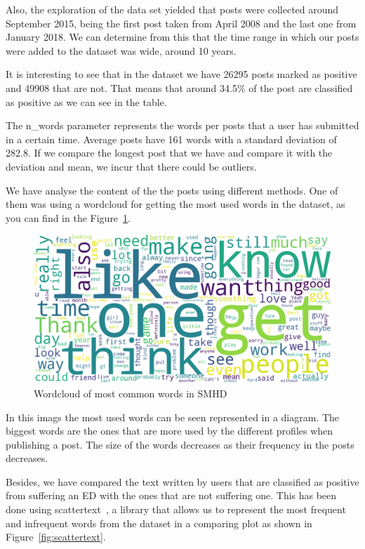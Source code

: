 Also, the exploration of the data set yielded that  posts were collected around September 2015, being the first post taken from April 2008 and the last one from January 2018. We can determine from this that the time range in which our posts were added to the dataset was wide, around 10 years.

It is interesting to see that in the dataset we have 26295 posts marked as positive and 49908 that are not. That means that around 34.5\% of the post are classified as positive as we can see in the table.

The n\_words parameter represents the words per posts that a user has submitted in a certain time. Average posts have 161 words with a standard deviation of 282.8. If we compare the longest post that we have and compare it with the deviation and mean, we incur that there could be outliers.

 We have analyse the content of the the posts using different methods. One of them was using a wordcloud for getting the most used words in the dataset, as you can find in the Figure~\ref{fig:SMHDwordcloud}.

\begin{figure}[!htp]
    \centering
    \includegraphics[scale=0.3]{img/detection/SMHD_wordcloud.png}
    \caption{Wordcloud of most common words in SMHD}
    \label{fig:SMHDwordcloud}
\end{figure}

In this imags the most used words can be seen represented in a diagram. The biggest words are the ones that are more used by the different profiles when publishing a post. The size of the words decreases as their frequency in the posts decreases.

Besides, we have compared the text written by users that are classified as positive from suffering an ED with the ones that are not suffering one. This has been done using scattertext~\cite{JasonKes0:online}, a library that allows us to represent the most frequent and infrequent words from the dataset in a comparing plot as shown in Figure~\ref{fig:scattertext}.

